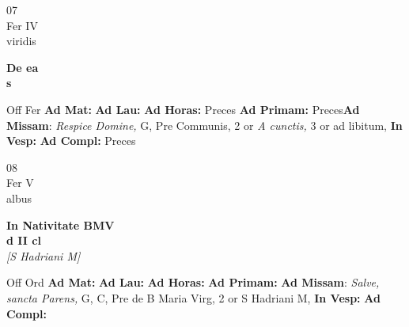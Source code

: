 \documentclass[10pt, openany]{book}
\begin{document}
    \begin{center}
        \begin{minipage}{3.5in}
            \vspace{2em}
            \begin{minipage}{0.5in}
                {\Huge 07} \\
                {\normalsize Fer IV} \\
                {\normalsize viridis}
            \end{minipage}
            \begin{minipage}{3.0in}
                \textbf{ \large De ea \\
                \textnormal{\normalsize s}} \\ 
            \end{minipage}
            \begin{justify}Off Fer
                \textbf{Ad Mat: }
                \textbf{Ad Lau: }
                \textbf{Ad Horas: }Preces
                \textbf{Ad Primam: }Preces\textbf{Ad Missam}: \textit{Respice Domine,} G, Pre Communis, 2 or \textit{A cunctis,} 3 or ad libitum,  
                \textbf{In Vesp: }
                \textbf{Ad Compl: }Preces
            \end{justify}
        \end{minipage}
    \end{center}

    \begin{center}
        \begin{minipage}{3.5in}
            \vspace{2em}
            \begin{minipage}{0.5in}
                {\Huge 08} \\
                {\normalsize Fer V} \\
                {\normalsize albus}
            \end{minipage}
            \begin{minipage}{3.0in}
                \textbf{ \large In Nativitate BMV \\
                \textnormal{\normalsize d II cl}} \\ \textit{[S Hadriani M]} \\ 
            \end{minipage}
            \begin{justify}Off Ord
                \textbf{Ad Mat: }
                \textbf{Ad Lau: }
                \textbf{Ad Horas: }
                \textbf{Ad Primam: }\textbf{Ad Missam}: \textit{Salve, sancta Parens,} G, C, Pre de B Maria Virg, 2 or S Hadriani M,  
                \textbf{In Vesp: }
                \textbf{Ad Compl: }
            \end{justify}
        \end{minipage}
    \end{center}
\end{document}
